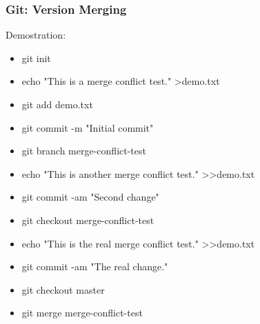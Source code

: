 \begin{frame}

\frametitle{Git: Version Merging}

Demostration:

\begin{itemize}[<+(1)->]

\item git init
\item echo "This is a merge conflict test." \textgreater demo.txt
\item git add demo.txt
\item git commit -m "Initial commit"
\item git branch merge-conflict-test
\item echo "This is another merge conflict test." \textgreater\textgreater demo.txt
\item git commit -am "Second change"
\item git checkout merge-conflict-test
\item echo "This is the real merge conflict test." \textgreater\textgreater demo.txt
\item git commit -am "The real change."
\item git checkout master
\item git merge merge-conflict-test

\end{itemize}

\end{frame}